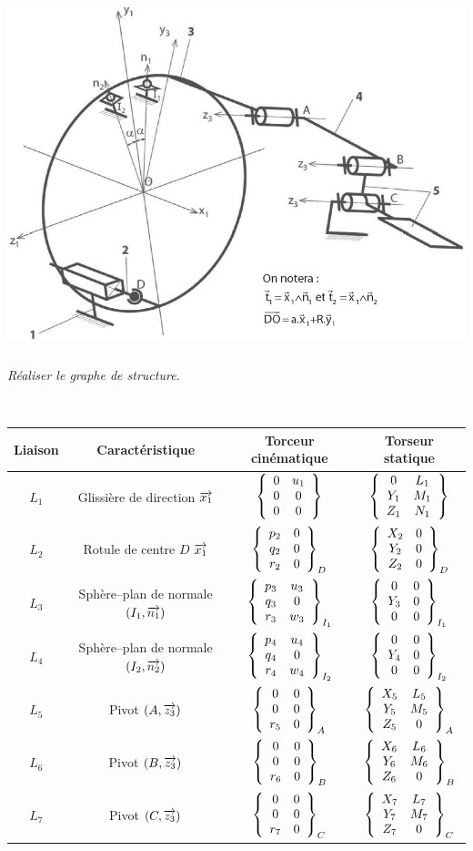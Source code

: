 \documentclass[10pt,fleqn]{article} %
\begin{document}
\begin{multicols}{2}
\begin{center}
\includegraphics[width=\linewidth]{images/fig_03}
\textit{}
\end{center}


\subparagraph{}\textit{Réaliser le graphe de structure.}%
\ifprof
\begin{corrige}~\\
\begin{center}
\begin{tabular}{|c|c|c|c|}
\hline
Liaison & Caractéristique & Torceur cinématique & Torseur statique \\
\hline\hline
$L_1 $ & Glissière de direction $\vect{x_1}$ & 
$\torseurcol{0}{0}{0}{u_1}{0}{0}{}$ & 
$\torseurcol{0}{Y_1}{Z_1}{L_1}{M_1}{N_1}{}$ \\ \hline
$L_2 $ & Rotule de centre $D$ $\vect{x_1}$ & 
$\torseurcol{p_2}{q_2}{r_2}{0}{0}{0}{D}$ & 
$\torseurcol{X_2}{Y_2}{Z_2}{0}{0}{0}{D}$ \\ \hline
$L_3 $ & Sphère--plan de normale $\left(I_1,\vect{n_1}\right)$ & 
$\torseurcol{p_3}{q_3}{r_3}{u_3}{0}{w_3}{I_1}$ & 
$\torseurcol{0}{Y_3}{0}{0}{0}{0}{I_1}$ \\ \hline
$L_4 $ & Sphère--plan de normale $\left(I_2,\vect{n_2}\right)$ & 
$\torseurcol{p_4}{q_4}{r_4}{u_4}{0}{w_4}{I_2}$ & 
$\torseurcol{0}{Y_4}{0}{0}{0}{0}{I_2}$ \\ \hline
$L_5 $ & Pivot $\left(A,\vect{z_3}\right)$ & 
$\torseurcol{0}{0}{r_5}{0}{0}{0}{A}$ & 
$\torseurcol{X_5}{Y_5}{Z_5}{L_5}{M_5}{0}{A}$ \\ \hline
$L_6 $ & Pivot $\left(B,\vect{z_3}\right)$ & 
$\torseurcol{0}{0}{r_6}{0}{0}{0}{B}$ & 
$\torseurcol{X_6}{Y_6}{Z_6}{L_6}{M_6}{0}{B}$ \\ \hline
$L_7 $ & Pivot $\left(C,\vect{z_3}\right)$ & 
$\torseurcol{0}{0}{r_7}{0}{0}{0}{C}$ & 
$\torseurcol{X_7}{Y_7}{Z_7}{L_7}{M_7}{0}{C}$ \\ \hline
\end{tabular}
\end{center}
\end{corrige}
\else
\fi


\end{multicols}
\end{document}
